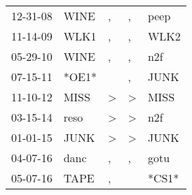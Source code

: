\begin{supertabular}{lllll}
 12-31-08 &   WINE &             , &             , &   peep \\
 11-14-09 &   WLK1 &             , &             , &   WLK2 \\
 05-29-10 &   WINE &             , &             , &    n2f \\
 07-15-11 &  *OE1* &               &             , &   JUNK \\
 11-10-12 &   MISS &  \textgreater &  \textgreater &   MISS \\
 03-15-14 &   reso &  \textgreater &  \textgreater &    n2f \\
 01-01-15 &   JUNK &  \textgreater &  \textgreater &   JUNK \\
 04-07-16 &   danc &             , &             , &   gotu \\
 05-07-16 &   TAPE &             , &               &  *CS1* \\
\end{supertabular}
